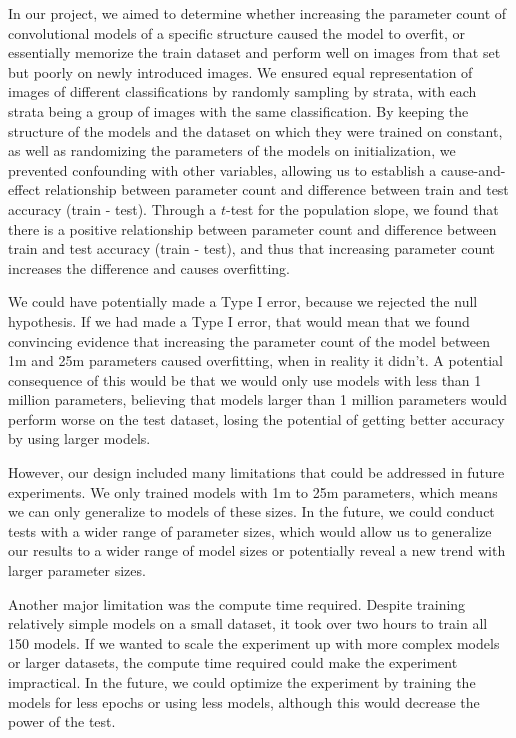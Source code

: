 \documentclass[12pt]{article}
\begin{document}
    In our project, we aimed to determine whether increasing the parameter count of convolutional models of a specific structure caused the model to overfit,
    or essentially memorize the train dataset and perform well on images from that set but poorly on newly introduced images. We ensured equal representation
    of images of different classifications by randomly sampling by strata, with each strata being a group of images with the same classification.
    By keeping the structure of the models and the dataset on which they were trained on constant, as well as randomizing the parameters of the models
    on initialization, we prevented confounding with other variables, allowing us to establish a cause-and-effect relationship between parameter count
    and difference between train and test accuracy (train - test). Through a $t$-test for the population slope, we found that there is a positive relationship
    between parameter count and difference between train and test accuracy (train - test), and thus that increasing parameter count increases the difference and causes overfitting.

    We could have potentially made a Type I error, because we rejected the null hypothesis. If we had made a Type I error,
    that would mean that we found convincing evidence that increasing the parameter count of the model between 1m and 25m parameters
    caused overfitting, when in reality it didn't. A potential consequence of this would be that we would only use models with less than 1 million parameters,
    believing that models larger than 1 million parameters would perform worse on the test dataset, losing the potential
    of getting better accuracy by using larger models.

    However, our design included many limitations that could be addressed in future experiments.
    We only trained models with 1m to 25m parameters, which means we can only generalize to models of these sizes.
    In the future, we could conduct tests with a wider range of parameter sizes, which would allow us to generalize our results to a wider range of model sizes or potentially reveal a new trend with larger parameter sizes.

    Another major limitation was the compute time required. Despite training relatively simple models on a small dataset, it took over two hours to train all 150 models.
    If we wanted to scale the experiment up with more complex models or larger datasets, the compute time required could make the experiment impractical.
    In the future, we could optimize the experiment by training the models for less epochs or using less models, although this would decrease the power of the test.
\end{document}
